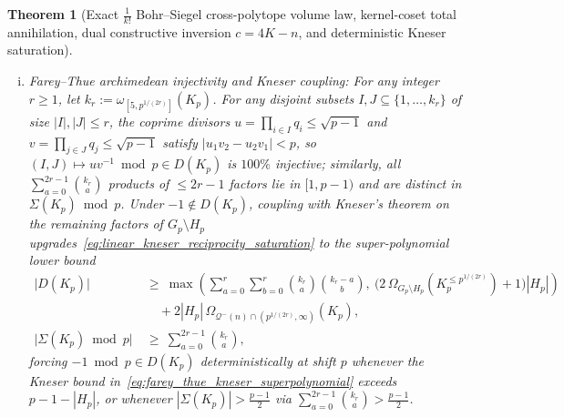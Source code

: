 \documentclass[11pt, a4paper]{article}
\theoremstyle{plain}
\newtheorem{theorem}{Theorem}[section]
\theoremstyle{definition}
\begin{document}
\begin{theorem}[Exact $\frac{1}{k!}$ Bohr--Siegel cross-polytope volume law, kernel-coset total annihilation, dual constructive inversion $c=4K-n$, and deterministic Kneser saturation]
\begin{enumerate}[(a)]
\begin{enumerate}[(i)]
        \item \emph{Farey--Thue archimedean injectivity and Kneser coupling:} For any integer $r\ge1$, let $k_r:=\omega_{[5,p^{1/(2r)}]}(K_p)$. For any disjoint subsets $I,J\subseteq\{1,\dots,k_r\}$ of size $|I|,|J|\le r$, the coprime divisors $u=\prod_{i\in I}q_i\le\sqrt{p-1}$ and $v=\prod_{j\in J}q_j\le\sqrt{p-1}$ satisfy $|u_1 v_2-u_2 v_1|<p$, so $(I,J)\mapsto uv^{-1}\bmod p\in D(K_p)$ is $100\%$ injective; similarly, all $\sum_{a=0}^{2r-1}\binom{k_r}{a}$ products of $\le 2r-1$ factors lie in $[1,p-1)$ and are distinct in $\Sigma(K_p)\bmod p$. Under $-1\notin D(K_p)$, coupling with Kneser's theorem on the remaining factors of $G_p\setminus H_p$ upgrades~\eqref{eq:linear_kneser_reciprocity_saturation} to the super-polynomial lower bound
        \begin{equation}\label{eq:farey_thue_kneser_superpolynomial}
        \begin{split}
        \big|D(K_p)\big|\ &\ge\ \max\!\left(\sum_{a=0}^{r}\sum_{b=0}^{r}\binom{k_r}{a}\binom{k_r-a}{b},\ \big(2\,\Omega_{G_p\setminus H_p}(K_p^{\le p^{1/(2r)}})+1\big)|H_p|\right)\\
        &\quad +2|H_p|\,\Omega_{\mathcal{Q}^{-}(n)\cap(p^{1/(2r)},\infty)}(K_p),\\
        \big|\Sigma(K_p)\bmod p\big|\ &\ge\ \sum_{a=0}^{2r-1}\binom{k_r}{a},
        \end{split}
        \end{equation}
        forcing $-1\bmod p\in D(K_p)$ deterministically at shift $p$ whenever the Kneser bound in~\eqref{eq:farey_thue_kneser_superpolynomial} exceeds $p-1-|H_p|$, or whenever $|\Sigma(K_p)|>\frac{p-1}{2}$ via $\sum_{a=0}^{2r-1}\binom{k_r}{a}>\frac{p-1}{2}$.


\end{enumerate}
\end{enumerate}
\end{theorem}
\end{document}

